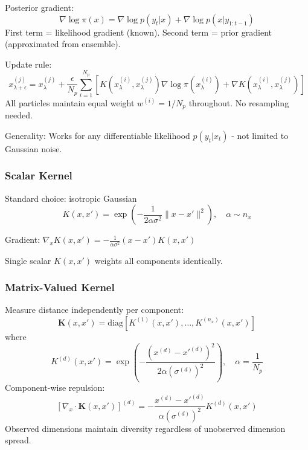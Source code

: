 \documentclass{article}
\begin{document}
Posterior gradient:
\begin{equation}
\nabla \log \pi(x) = \nabla \log p(y_t | x) + \nabla \log p(x | y_{1:t-1})
\end{equation}
First term = likelihood gradient (known). Second term = prior gradient (approximated from ensemble).

Update rule:
\begin{equation}
x_{\lambda+\epsilon}^{(j)} = x_\lambda^{(j)} + \frac{\epsilon}{N_p} \sum_{i=1}^{N_p} \left[K(x^{(i)}_\lambda, x^{(j)}_\lambda)\nabla \log \pi(x^{(i)}_\lambda) + \nabla K(x^{(i)}_\lambda, x^{(j)}_\lambda)\right]
\end{equation}
All particles maintain equal weight $w^{(i)} = 1/N_p$ throughout. No resampling needed.

Generality: Works for any differentiable likelihood $p(y_t | x_t)$ - not limited to Gaussian noise.
\subsubsection{Scalar Kernel}

Standard choice: isotropic Gaussian
\begin{equation}
K(x,x') = \exp\left(-\frac{1}{2\alpha\sigma^2}\|x-x'\|^2\right), \quad \alpha \sim n_x
\end{equation}

Gradient: $\nabla_x K(x,x') = -\frac{1}{\alpha\sigma^2}(x-x') K(x,x')$

Single scalar $K(x,x')$ weights all components identically.

\subsubsection{Matrix-Valued Kernel}

Measure distance independently per component:
\begin{equation}
\mathbf{K}(x,x') = \text{diag}\left[K^{(1)}(x,x'), \ldots, K^{(n_x)}(x,x')\right]
\end{equation}
where
\begin{equation}
K^{(d)}(x,x') = \exp\left(-\frac{(x^{(d)} - x'^{(d)})^2}{2\alpha (\sigma^{(d)})^2}\right), \quad \alpha = \frac{1}{N_p}
\end{equation}
Component-wise repulsion:
\begin{equation}
\left[\nabla_x \cdot \mathbf{K}(x,x')\right]^{(d)} = -\frac{x^{(d)} - x'^{(d)}}{\alpha (\sigma^{(d)})^2} K^{(d)}(x,x')
\end{equation}
Observed dimensions maintain diversity regardless of unobserved dimension spread.
\end{document}
